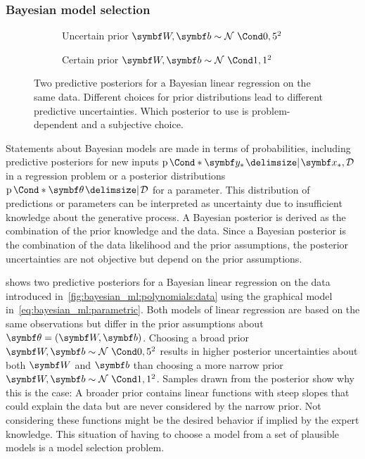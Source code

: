 \subsubsection{Bayesian model selection}
\begin{figure}[t]
    \begin{subfigure}[b]{\halffigurewidth}
        \centering
        \caption{
            Uncertain prior $\mat{W}, \mat{b} \sim \Gaussian{0, 5^2}$
            \label{fig:bayesian_ml:polynomials:bayes_broad}
        }
    \end{subfigure}
    \hfill
    \begin{subfigure}[b]{\halffigurewidth}
        \centering
        \caption{
            Certain prior $\mat{W}, \mat{b} \sim \Gaussian{1, 1^2}$
            \label{fig:bayesian_ml:polynomials:bayes_narrow}
        }
    \end{subfigure}
    \caption[Bayesian linear regression posteriors]{
        \label{fig:bayesian_ml:polynomials:bayes}
        Two predictive posteriors for a Bayesian linear regression on the same data.
        Different choices for prior distributions lead to different predictive uncertainties.
        Which posterior to use is problem-dependent and a subjective choice.
    }
\end{figure}
Statements about Bayesian models are made in terms of probabilities, including predictive posteriors for new inputs $\Prob*{\mat{y}_\ast \given \mat{x}_\ast, \Dc}$ in a regression problem or a posterior distributions $\Prob*{\mat{\theta} \given \Dc}$ for a parameter.
This distribution of predictions or parameters can be interpreted as uncertainty due to insufficient knowledge about the generative process.
A Bayesian posterior is derived as the combination of the prior knowledge and the data.
Since a Bayesian posterior is the combination of the data likelihood and the prior assumptions, the posterior uncertainties are not objective but depend on the prior assumptions.

 shows two predictive posteriors for a Bayesian linear regression on the data introduced in~\cref{fig:bayesian_ml:polynomials:data} using the graphical model in~\cref{eq:bayesian_ml:parametric}.
Both models of linear regression are based on the same observations but differ in the prior assumptions about $\mat{\theta} = (\mat{W}, \mat{b})$.
Choosing a broad prior $\mat{W}, \mat{b} \sim \Gaussian{0, 5^2}$ results in higher posterior uncertainties about both $\mat{W}$ and $\mat{b}$ than choosing a more narrow prior $\mat{W}, \mat{b} \sim \Gaussian{1, 1^2}$.
Samples drawn from the posterior show why this is the case:
A broader prior contains linear functions with steep slopes that could explain the data but are never considered by the narrow prior.
Not considering these functions might be the desired behavior if implied by the expert knowledge.
This situation of having to choose a model from a set of plausible models is a model selection problem.

